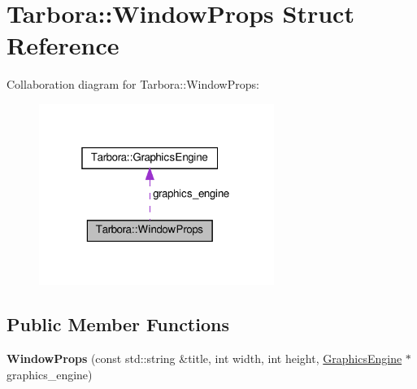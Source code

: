 \hypertarget{structTarbora_1_1WindowProps}{}\section{Tarbora\+:\+:Window\+Props Struct Reference}
\label{structTarbora_1_1WindowProps}


Collaboration diagram for Tarbora\+:\+:Window\+Props\+:\nopagebreak
\begin{figure}[H]
\begin{center}
\leavevmode
\includegraphics[width=217pt]{structTarbora_1_1WindowProps__coll__graph}
\end{center}
\end{figure}
\subsection*{Public Member Functions}
\begin{DoxyCompactItemize}
\item 
\mbox{\label{structTarbora_1_1WindowProps_a6106ebcc781d54829b580e9e72d48f33}} 
{\bfseries Window\+Props} (const std\+::string \&title, int width, int height, \hyperlink{classTarbora_1_1GraphicsEngine}{Graphics\+Engine} $\ast$graphics\+\_\+engine)
\end{DoxyCompactItemize}
